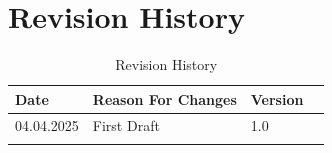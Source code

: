 \chapter*{Revision History}

 \begin{table}[h] 
 \centering
 \begin{tabularx}{0.8\textwidth}{|X|X|X|X|}
 \hline
Date & Reason For Changes & Version   \\ \hline
04.04.2025 & First Draft  & 1.0 \\ \hline
 &   &      \\ \hline
\end{tabularx}
\caption{Revision History \label{Tab:Example}}

\end{table}

